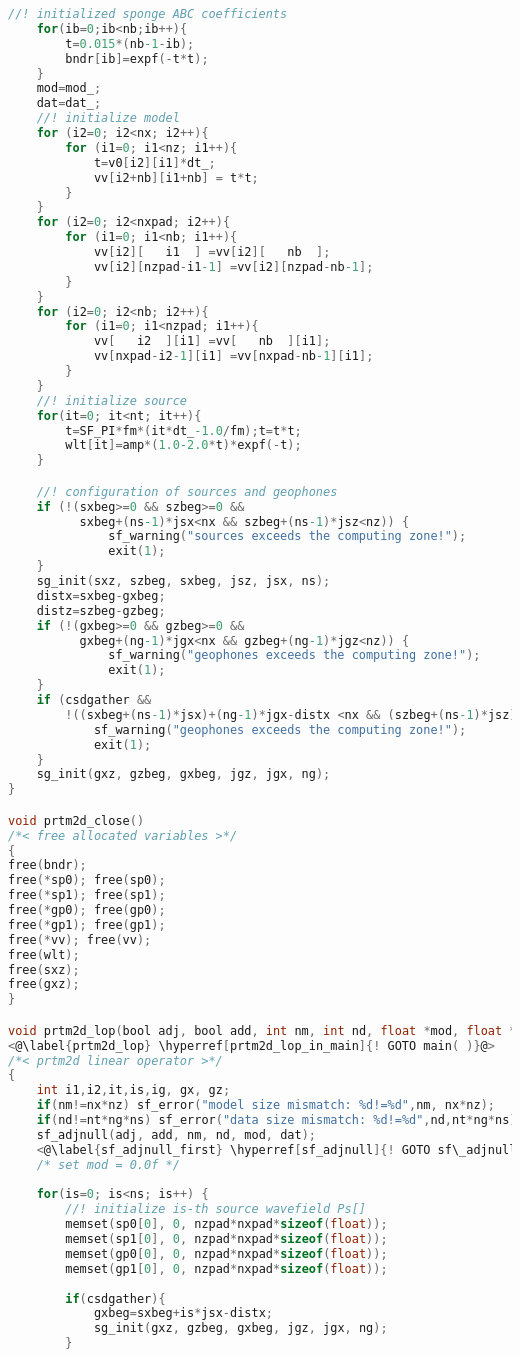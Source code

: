 \documentclass[a4paper,11pt]{article}
\theoremstyle{mytheor}
\begin{document}
\begin{lstlisting}[label={prtm2d},language=C,tabsize=4,caption=prtm2d.c]
	//! initialized sponge ABC coefficients
	for(ib=0;ib<nb;ib++){
		t=0.015*(nb-1-ib);
		bndr[ib]=expf(-t*t);
	}
	mod=mod_;
	dat=dat_;
	//! initialize model
	for (i2=0; i2<nx; i2++){
		for (i1=0; i1<nz; i1++){
			t=v0[i2][i1]*dt_;
			vv[i2+nb][i1+nb] = t*t;
		}	
	}
	for (i2=0; i2<nxpad; i2++){
		for (i1=0; i1<nb; i1++){
			vv[i2][   i1  ] =vv[i2][   nb  ];
			vv[i2][nzpad-i1-1] =vv[i2][nzpad-nb-1];
		}
	}
	for (i2=0; i2<nb; i2++){
		for (i1=0; i1<nzpad; i1++){
			vv[   i2  ][i1] =vv[   nb  ][i1];
			vv[nxpad-i2-1][i1] =vv[nxpad-nb-1][i1];
		}
	}
	//! initialize source
	for(it=0; it<nt; it++){
		t=SF_PI*fm*(it*dt_-1.0/fm);t=t*t;
		wlt[it]=amp*(1.0-2.0*t)*expf(-t);
	}

	//! configuration of sources and geophones
	if (!(sxbeg>=0 && szbeg>=0 && 
	      sxbeg+(ns-1)*jsx<nx && szbeg+(ns-1)*jsz<nz)) { 
		      sf_warning("sources exceeds the computing zone!"); 
		      exit(1);
	}
	sg_init(sxz, szbeg, sxbeg, jsz, jsx, ns);
	distx=sxbeg-gxbeg;
	distz=szbeg-gzbeg;
	if (!(gxbeg>=0 && gzbeg>=0 &&
	      gxbeg+(ng-1)*jgx<nx && gzbeg+(ng-1)*jgz<nz)) { 
		      sf_warning("geophones exceeds the computing zone!");
		      exit(1);
	}
	if (csdgather && 
		!((sxbeg+(ns-1)*jsx)+(ng-1)*jgx-distx <nx && (szbeg+(ns-1)*jsz)+(ng-1)*jgz-distz <nz)){
			sf_warning("geophones exceeds the computing zone!");
			exit(1);
	}
	sg_init(gxz, gzbeg, gxbeg, jgz, jgx, ng);
}

void prtm2d_close()
/*< free allocated variables >*/
{
free(bndr);
free(*sp0); free(sp0);
free(*sp1); free(sp1);
free(*gp0); free(gp0);
free(*gp1); free(gp1);
free(*vv); free(vv);
free(wlt);
free(sxz);
free(gxz);
}

void prtm2d_lop(bool adj, bool add, int nm, int nd, float *mod, float *dat)
<@\label{prtm2d_lop} \hyperref[prtm2d_lop_in_main]{! GOTO main( )}@>
/*< prtm2d linear operator >*/
{
	int i1,i2,it,is,ig, gx, gz;
	if(nm!=nx*nz) sf_error("model size mismatch: %d!=%d",nm, nx*nz);
	if(nd!=nt*ng*ns) sf_error("data size mismatch: %d!=%d",nd,nt*ng*ns);
	sf_adjnull(adj, add, nm, nd, mod, dat); 
	<@\label{sf_adjnull_first} \hyperref[sf_adjnull]{! GOTO sf\_adjnull( )}@>
	/* set mod = 0.0f */
	
	for(is=0; is<ns; is++) {
		//! initialize is-th source wavefield Ps[]
		memset(sp0[0], 0, nzpad*nxpad*sizeof(float));
		memset(sp1[0], 0, nzpad*nxpad*sizeof(float));
		memset(gp0[0], 0, nzpad*nxpad*sizeof(float));
		memset(gp1[0], 0, nzpad*nxpad*sizeof(float));
		
		if(csdgather){
			gxbeg=sxbeg+is*jsx-distx;
			sg_init(gxz, gzbeg, gxbeg, jgz, jgx, ng);
		}


\end{lstlisting}
\end{document}

